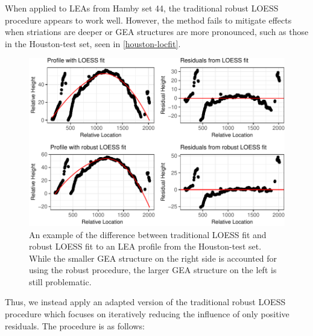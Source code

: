 \documentclass[12pt]{article}
\begin{document}
When applied to LEAs from Hamby set 44, the traditional robust LOESS
procedure appears to work well. However, the method fails to mitigate
effects when striations are deeper or GEA structures are more
pronounced, such as those in the Houston-test set, seen in
\autoref{houston-locfit}.

\begin{figure}
\centering
\includegraphics{writeup_files/figure-latex/houston-locfit-1.pdf}
\caption{\label{houston-locfit}An example of the difference between
traditional LOESS fit and robust LOESS fit to an LEA profile from the
Houston-test set. While the smaller GEA structure on the right side is
accounted for using the robust procedure, the larger GEA structure on
the left is still problematic.}
\end{figure}

Thus, we instead apply an adapted version of the traditional robust
LOESS procedure which focuses on iteratively reducing the influence of
only positive residuals. The procedure is as follows:
\end{document}
